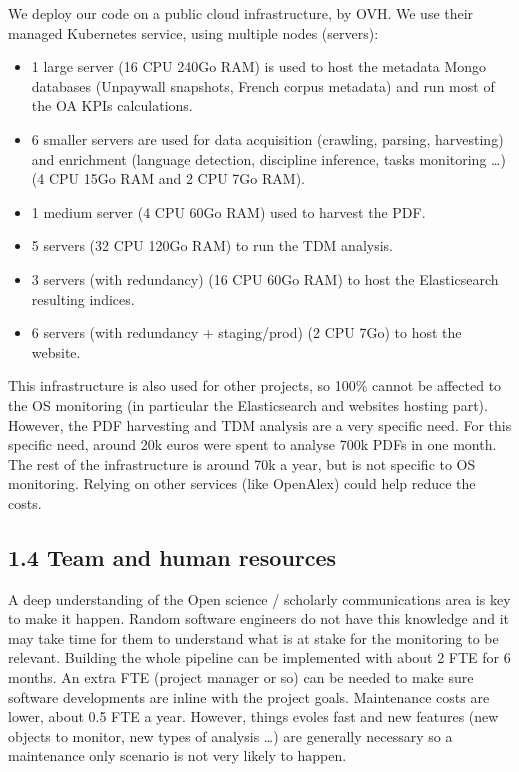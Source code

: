 \documentclass[
]{article}
\begin{document}
We deploy our code on a public cloud infrastructure, by OVH. We use
their managed Kubernetes service, using multiple nodes (servers):

\begin{itemize}
\item
  1 large server (16 CPU 240Go RAM) is used to host the metadata Mongo
  databases (Unpaywall snapshots, French corpus metadata) and run most
  of the OA KPIs calculations.
\item
  6 smaller servers are used for data acquisition (crawling, parsing,
  harvesting) and enrichment (language detection, discipline inference,
  tasks monitoring \ldots) (4 CPU 15Go RAM and 2 CPU 7Go RAM).
\item
  1 medium server (4 CPU 60Go RAM) used to harvest the PDF.
\item
  5 servers (32 CPU 120Go RAM) to run the TDM analysis.
\item
  3 servers (with redundancy) (16 CPU 60Go RAM) to host the
  Elasticsearch resulting indices.
\item
  6 servers (with redundancy + staging/prod) (2 CPU 7Go) to host the
  website.
\end{itemize}

This infrastructure is also used for other projects, so 100\% cannot be
affected to the OS monitoring (in particular the Elasticsearch and
websites hosting part). However, the PDF harvesting and TDM analysis are
a very specific need. For this specific need, around 20k euros were
spent to analyse 700k PDFs in one month. The rest of the infrastructure
is around 70k a year, but is not specific to OS monitoring. Relying on
other services (like OpenAlex) could help reduce the costs.

\hypertarget{team-and-human-resources}{%
\subsection{1.4 Team and human
resources}\label{team-and-human-resources}}

A deep understanding of the Open science / scholarly communications area
is key to make it happen. Random software engineers do not have this
knowledge and it may take time for them to understand what is at stake
for the monitoring to be relevant. Building the whole pipeline can be
implemented with about 2 FTE for 6 months. An extra FTE (project manager
or so) can be needed to make sure software developments are inline with
the project goals. Maintenance costs are lower, about 0.5 FTE a year.
However, things evoles fast and new features (new objects to monitor,
new types of analysis \ldots) are generally necessary so a maintenance
only scenario is not very likely to happen.
\end{document}
